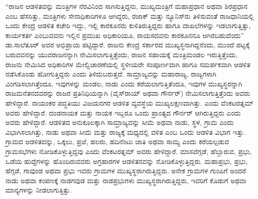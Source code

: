 “ರಾಜನ ಆಡಳಿತವನ್ನು ಮಂತ್ರಿಗಳ ನೆರವಿನಿಂದ ಸಾಗಿಸುತ್ತಿದ್ದನು, ಮುಖ್ಯಮಂತ್ರಿಗೆ ಮಹಾಪ್ರಧಾನ ಅಥವಾ ಶಿರಪ್ರಧಾನ ಎಂಬ ಹೆಸರಿತ್ತು, ಮಂತ್ರಿಗಳು ಸೇನಾಧಿಕಾರಿಗಳೂ ಆಗಿದ್ದರು, ರಜಾಕ್​ ಮತ್ತು ನ್ಯೂನಿಸ್​ರು ತಿಳಿಸುವಂತೆ ರಾಜಧಾನಿಯಲ್ಲಿ ಒಂದು ಕೇಂದ್ರ ಆಡಳಿತ ಕಚೇರಿ ಇದ್ದು, ಇಲ್ಲಿ ಕಾರಕೂನರು ಕುಳಿತಿರುತ್ತಿದ್ದರು ಹಾಗೂ ದಾಖಲೆಗಳನ್ನು ಇಡಲಾಗುತ್ತಿತ್ತು, ಕಾರ್ಯಕರ್ತ ಎಂಬುವವನು ಇಲ್ಲಿನ ಪ್ರಮುಖ ಅಧಿಕಾರಿಯೂ, ರಾಯಸದವನು ಕಾರಕೂನನೂ ಆಗಿರ\-ಬಹುದೆಂದು” ಡಾ.ಸಾಲೆತೂರ್​ ಅವರ ಅಭಿಪ್ರಾಯ ಪಟ್ಟಿದ್ದಾರೆ. ರಾಜನು ಕೇಂದ್ರ ಸರ್ಕಾರದ ಮುಖ್ಯಸ್ಥನಾಗಿದ್ದನೆಂದು, ಮುಂದೆ ಪಟ್ಟಕ್ಕೆ ಬರುವವನನ್ನು ಯುವರಾಜನನ್ನಾಗಿ ನೇಮಿಸಲಾಗುತ್ತಿತ್ತೆಂದು, ರಾಜನ ಸಹಾಯಕ್ಕೆ ಮಂತ್ರಿಮಂಡಲ ಇರುತ್ತಿ\-ತ್ತೆಂದು, ರಾಜನು ನೇಮಿಸಿದ ಅಧಿಕಾರಿಗಳ ಮೇಲ್ವಿಚಾರಣೆಯಲ್ಲಿ ಸ್ಥಳೀಯರೇ ಸಂಪೂರ್ಣವಾಗಿ ಹಾಗೂ ಸಮರ್ಪಕವಾಗಿ ಆಡಳಿತ ನಡೆಸಿಕೊಂಡು ಹೋಗುತ್ತಿದ್ದರು ಎಂದು ತಿಳಿದುಬರುತ್ತದೆ. ಸಾಮ್ರಾಜ್ಯವನ್ನು ಮಹಾರಾಜ್ಯ, ರಾಜ್ಯಗಳಾಗಿ ವಿಂಗಡಿಸಲಾಗಿತ್ತೆಂದೂ, ಇವುಗಳನ್ನು ಮಂಡಲ, ನಾಡು ಎಂದು ಕರೆಯಲಾಗುತ್ತಿತೆಂದೂ, ಇವುಗಳ ಮುಖ್ಯಸ್ಥರನ್ನಾಗಿ ರಾಜಮನೆತನದವರನ್ನು ರಾಜರ ಪ್ರತಿನಿಧಿಯನ್ನಾಗಿ (ವೈಸ್​ರಾಯ್​ ಅಥವಾ ಗೌರ್ನರ್​) ನೇಮಿಸಲಾಗುತ್ತಿತ್ತೆಂದು ಅವರು ಹೇಳಿದ್ದಾರೆ. ನಾಯಂಕರ ಪದ್ಧತಿಯು ವಿಜಯನಗರ ಆಡಳಿತ ವ್ಯವಸ್ಥೆಯ ಮುಖ್ಯಲಕ್ಷಣವಾಗಿತ್ತು.  ಎಂದು ವೆಂಕಟರತ್ನಮ್ ಅವರು ಹೇಳಿದ್ದಾರೆ. ದಂಡನಾಯಕ ಮತ್ತು ನಾಯಕ ಇಬ್ಬರೂ ಒಂದು ಪ್ರಾಂತ್ಯದ ಗೌರ್ನರ್​ ಆಗಿರುತ್ತಿದ್ದರು ಎಂದು ಅವರು ಹೇಳಿದ್ದಾರೆ. ಆಡಳಿತದ ಅನುಕೂಲಕ್ಕಾಗಿ ಸಾಮ್ರಾಜ್ಯವನ್ನು ಸೀಮೆ ಅಥವಾ ನಾಡು, ಸ್ಥಳ, ಗ್ರಾಮ ಎಂದು ವಿಭಾಗಿಸಲಾಗಿತ್ತು, ನಾಡು ಅಥವಾ ಸೀಮೆ ಮತ್ತು ರಾಜ್ಯಕ್ಕೆ ಮಧ್ಯದಲ್ಲಿ ವಳಿತ ಎಂಬ ಒಂದು ಆಡಳಿತ ವಿಭಾಗ ಇತ್ತು. ಗ್ರಾಮದ ಆಡಳಿತವನ್ನು, ಒಕ್ಕಲು, ಪ್ರಜೆ, ಹಲರು, ಹದಿನೆಂಟು ಜಾತಿ ಅಥವಾ ಸಾಮ್ಯ ಎಂದು ಕರೆಯಲ್ಪಡುವ ಗ್ರಾಮಸಭೆಗಳು ನೋಡಿಕೊಳ್ಳುತ್ತಿದ್ದವು ಎಂದು ವೆಂಕಟರತ್ನಮ್ ಅವರು ಹೇಳಿದ್ದಾರೆ. ಮಾಸವೆಗ್ಗಡೆ, ಹೆಬ್ಬಾರುವ, ಪ್ರಭು, ಒಡೆಯ ಹುದ್ದೆಗಳನ್ನು ಹೊಂದಿರುವವರು ಅಗ್ರಹಾರಗಳ ಆಡಳಿತನವನ್ನು ನೋಡಿಕೊಳ್ಳುತ್ತಿದ್ದರು. ಮಹಾಪ್ರಭು, ಪ್ರಭು, ಹೆಗ್ಗಡೆ, ಗಾವುಂಡ ಅಥವಾ ಪ್ರಭು ಇವರು ಗ್ರಾಮಗಳ ಮುಖ್ಯಸ್ಥರಾಗಿರುತ್ತಿದ್ದರು. ಅನೇಕ ಗ್ರಾಮಗಳ ಗುಂಪಿಗೆ ಅಂದರೆ ನಾಡು ಅಥವಾ ಕಂಪಣಕ್ಕೆ ನಾಡಗವುಡ ಮತ್ತು ನಾಡಪ್ರಭುಗಳು ಮುಖ್ಯಸ್ಥರಾಗಿರುತ್ತಿದ್ದರು, ಇವರಿಗೆ ಕೊಡುಗೆ ಅಥವಾ ಮಾನ್ಯಗಳನ್ನು ನೀಡಲಾಗುತ್ತಿತ್ತು.


